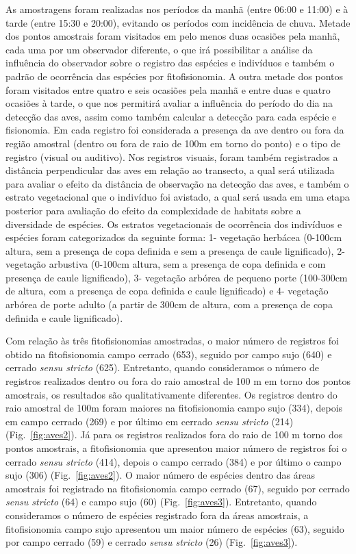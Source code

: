 As amostragens foram realizadas nos períodos da manhã (entre 06:00 e
11:00) e à tarde (entre 15:30 e 20:00), evitando os períodos com
incidência de chuva. Metade dos pontos amostrais foram visitados em
pelo menos duas ocasiões pela manhã, cada uma por um observador
diferente, o que irá possibilitar a análise da influência do
observador sobre o registro das espécies e indivíduos e também o
padrão de ocorrência das espécies por fitofisionomia. A outra metade
dos pontos foram visitados entre quatro e seis ocasiões pela manhã e
entre duas e quatro ocasiões à tarde, o que nos permitirá avaliar a
influência do período do dia na detecção das aves, assim como também
calcular a detecção para cada espécie e fisionomia. Em cada registro
foi considerada a presença da ave dentro ou fora da região amostral
(dentro ou fora de raio de 100m em torno do ponto) e o tipo de
registro (visual ou auditivo). Nos registros visuais, foram também
registrados a distância perpendicular das aves em relação ao
transecto, a qual será utilizada para avaliar o efeito da distância de
observação na detecção das aves, e também o estrato vegetacional que o
indivíduo foi avistado, a qual será usada em uma etapa posterior para
avaliação do efeito da complexidade de habitats sobre a diversidade de
espécies. Os estratos vegetacionais de ocorrência dos indivíduos e
espécies foram categorizados da seguinte forma: 1- vegetação herbácea
(0-100cm altura, sem a presença de copa definida e sem a presença de
caule lignificado), 2- vegetação arbustiva (0-100cm altura, sem a
presença de copa definida e com presença de caule lignificado), 3-
vegetação arbórea de pequeno porte (100-300cm de altura, com a
presença de copa definida e caule lignificado) e 4- vegetação arbórea
de porte adulto (a partir de 300cm de altura, com a presença de copa
definida e caule lignificado).

Com relação às três fitofisionomias amostradas, o maior número de
registros foi obtido na fitofisionomia campo cerrado (653), seguido
por campo sujo (640) e cerrado \textit{sensu stricto}
(625). Entretanto, quando consideramos o número de registros
realizados dentro ou fora do raio amostral de 100 m em torno dos
pontos amostrais, os resultados são qualitativamente diferentes.  Os
registros dentro do raio amostral de 100m foram maiores na
fitofisionomia campo sujo (334), depois em campo cerrado (269) e por
último em cerrado \textit{sensu stricto} (214) (Fig.~\ref{fig:aves2}). Já para os
registros realizados fora do raio de 100 m torno dos pontos amostrais,
a fitofisionomia que apresentou maior número de registros foi o
cerrado \textit{sensu stricto} (414), depois o campo cerrado (384) e
por último o campo sujo (306) (Fig.~\ref{fig:aves2}). O maior número de espécies
dentro das áreas amostrais foi registrado na fitofisionomia campo
cerrado (67), seguido por cerrado \textit{sensu stricto} (64) e campo
sujo (60) (Fig.~\ref{fig:aves3}). Entretanto, quando consideramos o número de
espécies registrado fora da áreas amostrais, a fitofisionomia campo
sujo apresentou um maior número de espécies (63), seguido por campo
cerrado (59) e cerrado \textit{sensu stricto} (26) (Fig.~\ref{fig:aves3}).

